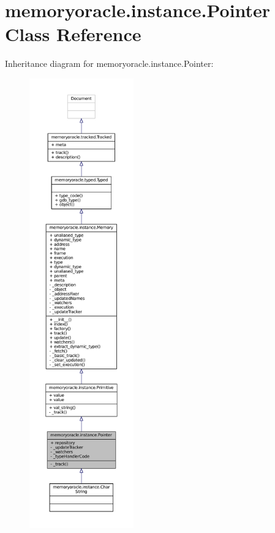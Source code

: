 \hypertarget{classmemoryoracle_1_1instance_1_1Pointer}{}\section{memoryoracle.\+instance.\+Pointer Class Reference}
\label{classmemoryoracle_1_1instance_1_1Pointer}


Inheritance diagram for memoryoracle.\+instance.\+Pointer\+:
\nopagebreak
\begin{figure}[H]
\begin{center}
\leavevmode
\includegraphics[height=550pt]{classmemoryoracle_1_1instance_1_1Pointer__inherit__graph}
\end{center}
\end{figure}



